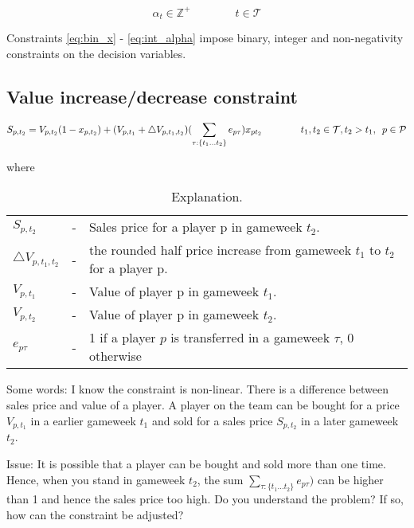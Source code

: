 \begin{equation} \label{eq:int_alpha}
    \alpha_{t} \in \mathbb{Z}^{+}  \qquad\qquad t \in \mathcal{T}
\end{equation}

Constraints \eqref{eq:bin_x} - \eqref{eq:int_alpha} impose binary, integer and non-negativity constraints on the decision variables.

\newpage

\subsection{Value increase/decrease constraint}

\begin{equation*}
    S_{p,t_{2}} = V_{p,t_{2}}(1-x_{p,t_{2}}) + (V_{p,t_{1}} + \triangle V_{p,t_{1},t_{2}}) (\sum_{\tau:\{ t_{1} \dots t_{2}\}} e_{p\tau}) x_{pt_{2}} \qquad\qquad t_{1}, t_{2} \in \mathcal{T}, t_{2} > t_{1}, \enskip p \in \mathcal{P}
\end{equation*}

where 


\begin{table}[H]
\centering
\caption{Explanation.}
\begin{tabular}{@{}lll@{}}
\toprule
$S_{p,t_{2}}$ & - & Sales price for a player p in gameweek $t_{2}$.\\
$\triangle V_{p,t_{1},t_{2}}$  & - & the rounded half price increase from gameweek $t_{1}$ to $t_{2}$ for a player p. \\ 
$V_{p,t_{1}}$   & - & Value of player p in gameweek $t_{1}$.                                             \\
$V_{p,t_{2}}$   & - & Value of player p in gameweek $t_{2}$.                                             \\
$e_{p\tau}$     & - & 1 if a player $p$ is transferred in a gameweek $\tau$, 0 otherwise                  \\
\bottomrule
\end{tabular}
\end{table}

Some words: I know the constraint is non-linear. There is a difference between sales price and value of a player. A player on the team can be bought for a price $V_{p,t_{1}}$ in a earlier gameweek $t_{1}$ and sold for a sales price $S_{p,t_{2}}$ in a later gameweek $t_{2}$.

\newpar

Issue: It is possible that a player can be bought and sold more than one time. Hence, when you stand in gameweek $t_{2}$, the sum $\sum_{\tau:\{ t_{1} \dots t_{2}\}} e_{p\tau})$ can be higher than 1 and hence the sales price too high. Do you understand the problem? If so, how can the constraint be adjusted? 


